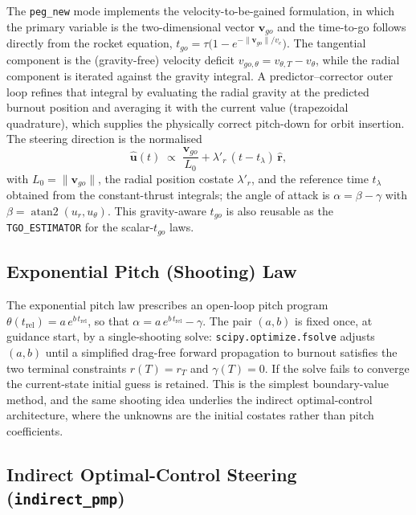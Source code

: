The \texttt{peg\_new} mode implements the velocity-to-be-gained formulation, in
which the primary variable is the two-dimensional vector $\mathbf{v}_{go}$ and the
time-to-go follows directly from the rocket equation,
$t_{go}=\tau\bigl(1-e^{-\lVert\mathbf{v}_{go}\rVert/v_e}\bigr)$. The tangential
component is the (gravity-free) velocity deficit
$v_{go,\theta}=v_{\theta,T}-v_\theta$, while the radial component is iterated
against the gravity integral. A predictor--corrector outer loop refines that
integral by evaluating the radial gravity at the predicted burnout position and
averaging it with the current value (trapezoidal quadrature), which supplies the
physically correct pitch-down for orbit insertion. The steering direction is the
normalised
\begin{equation}
  \hat{\mathbf u}(t) \;\propto\; \frac{\mathbf{v}_{go}}{L_0}
        + \lambda'_r\,(t-t_\lambda)\,\hat{\mathbf r},
  \label{eq:pegnew_u}
\end{equation}
with $L_0=\lVert\mathbf{v}_{go}\rVert$, the radial position costate $\lambda'_r$,
and the reference time $t_\lambda$ obtained from the constant-thrust integrals;
the angle of attack is $\alpha=\beta-\gamma$ with
$\beta=\operatorname{atan2}(u_r,u_\theta)$. This gravity-aware $t_{go}$ is also
reusable as the \texttt{TGO\_ESTIMATOR} for the scalar-$t_{go}$ laws.

\subsection{Exponential Pitch (Shooting) Law}
\label{ssec:exp_shooting}

The exponential pitch law prescribes an open-loop pitch program
$\theta(t_{\mathrm{rel}}) = a\,e^{b\,t_{\mathrm{rel}}}$, so that
$\alpha = a\,e^{b\,t_{\mathrm{rel}}}-\gamma$. The pair $(a,b)$ is fixed once, at
guidance start, by a single-shooting solve: \texttt{scipy.optimize.fsolve} adjusts
$(a,b)$ until a simplified drag-free forward propagation to burnout satisfies the
two terminal constraints $r(T)=r_T$ and $\gamma(T)=0$. If the solve fails to
converge the current-state initial guess is retained. This is the simplest
boundary-value method, and the same shooting idea underlies the indirect
optimal-control architecture, where the unknowns are the initial costates rather
than pitch coefficients.

\subsection{Indirect Optimal-Control Steering (\texttt{indirect\_pmp})}
\label{ssec:indirect_guidance}

